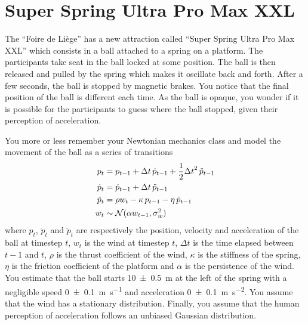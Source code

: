 \documentclass[11pt, a4paper]{article}
\begin{document}
\newpage

\section{Super Spring Ultra Pro Max XXL}

The \enquote{Foire de Liège} has a new attraction called \enquote{Super Spring Ultra Pro Max XXL} which consists in a ball attached to a spring on a platform. The participants take seat in the ball locked at some position. The ball is then released and pulled by the spring which makes it oscillate back and forth. After a few seconds, the ball is stopped by magnetic brakes. You notice that the final position of the ball is different each time. As the ball is opaque, you wonder if it is possible for the participants to guess where the ball stopped, given their perception of acceleration.

You more or less remember your Newtonian mechanics class and model the movement of the ball as a series of transitions
\begin{align*}
    p_t & = p_{t-1} + \Delta t \, \dot{p}_{t - 1} + \frac{1}{2} {\Delta t}^2 \, \ddot{p}_{t - 1} \\
    \dot{p}_t & = \dot{p}_{t - 1} + \Delta t \, \ddot{p}_{t - 1} \\
    \ddot{p}_t & = \rho w_t - \kappa \, p_{t - 1} - \eta \, \dot{p}_{t - 1} \\
    w_t & \sim \mathcal{N}(\alpha w_{t-1}, \sigma_w^2)
\end{align*}
where $p_t$, $\dot{p}_t$ and $\ddot{p}_t$ are respectively the position, velocity and acceleration of the ball at timestep $t$, $w_t$ is the wind at timestep $t$, $\Delta t$ is the time elapsed between $t-1$ and $t$, $\rho$ is the thrust coefficient of the wind, $\kappa$ is the stiffness of the spring, $\eta$ is the friction coefficient of the platform and $\alpha$ is the persistence of the wind. You estimate that the ball starts \qty{10 \pm 0.5}{\meter} at the left of the spring with a negligible speed \qty{0 \pm 0.1}{\meter\per\second} and acceleration \qty{0 \pm 0.1}{\meter\per\second\squared}. You assume that the wind has a stationary distribution. Finally, you assume that the human perception of acceleration follows an unbiased Gaussian distribution.
\end{document}
